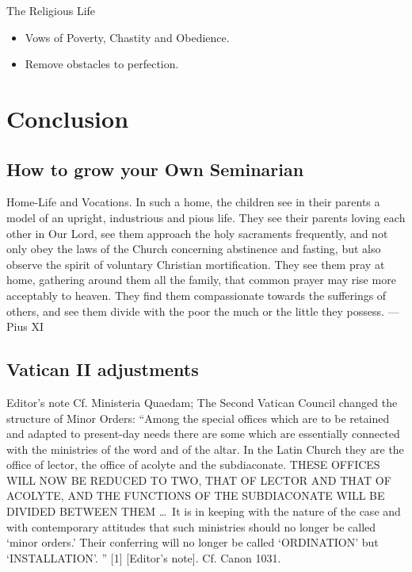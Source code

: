 \documentclass{beamer}
\begin{document}
\begin{frame}{The Religious Life}
\begin{itemize}
 \item Vows of Poverty, Chastity and Obedience.
 \item Remove obstacles to perfection.
\end{itemize}
\end{frame}

\section{Conclusion}

\subsection{How to grow your Own Seminarian}

\begin{frame}{Home-Life and Vocations.}
In such a home, the children see in their parents a model of an upright,
  industrious and pious life. They see their parents loving each  other  in
  Our Lord, see them approach the holy sacraments frequently, and not  only
  obey the laws of the Church concerning abstinence and fasting,  but  also
  observe the spirit of voluntary Christian mortification.  They  see  them
  pray at home, gathering around them all the family,  that  common  prayer
  may rise more acceptably to heaven. They find them compassionate  towards
  the sufferings of others, and see them divide with the poor the  much  or
  the little they possess. --- Pius XI
\end{frame}

\subsection{Vatican II adjustments}

\begin{frame}{Editor's note}
  Cf.  Ministeria  Quaedam;  The  Second  Vatican  Council
changed the structure of Minor Orders: ``Among the special offices which  are
to be retained and adapted to present-day needs there  are  some  which  are
essentially connected with the ministries of the word and of the  altar.  In
the Latin Church they are the office of lector, the office  of  acolyte  and
the subdiaconate. THESE OFFICES WILL NOW BE REDUCED TO TWO, THAT  OF  LECTOR
AND THAT OF ACOLYTE, AND THE FUNCTIONS OF THE SUBDIACONATE WILL  BE  DIVIDED
BETWEEN THEM \ldots\ It is in keeping with  the  nature  of  the  case  and  with
contemporary attitudes that such  ministries  should  no  longer  be  called
`minor orders.' Their conferring will no longer be called  `ORDINATION'  but
`INSTALLATION'. ''
[1] [Editor's note]. Cf. Canon 1031.
\end{frame}
\end{document}
